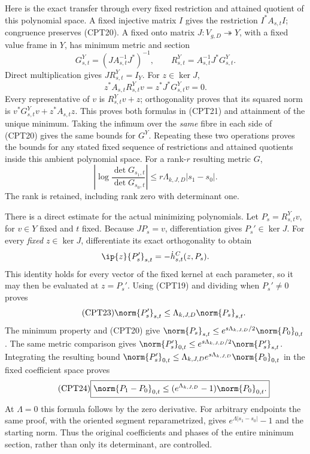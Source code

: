 \documentclass[11pt,a4paper]{article}
\begin{document}
Here is the exact transfer through every fixed restriction and
attained quotient of this polynomial space.  A fixed injective
matrix \(I\) gives the restriction \(I^*A_{s,t}I\); congruence
preserves (CPT20).  A fixed onto matrix
\(J:V_{g,D}\twoheadrightarrow Y\), with a fixed value frame in \(Y\),
has minimum metric and section
\begin{equation}\tag{CPT21}
 G^Y_{s,t}=(J A_{s,t}^{-1}J^*)^{-1},\qquad
 R^Y_{s,t}=A_{s,t}^{-1}J^*G^Y_{s,t}.
\end{equation}
Direct multiplication gives \(JR^Y_{s,t}=I_Y\).
For \(z\in\ker J\),
\[
 z^*A_{s,t}R^Y_{s,t}v=z^*J^*G^Y_{s,t}v=0.
\]
Every representative of \(v\) is \(R^Y_{s,t}v+z\); orthogonality
proves that its squared norm is
\(v^*G^Y_{s,t}v+z^*A_{s,t}z\).
This proves both formulas in (CPT21) and attainment of the unique
minimum.  Taking the infimum over the \emph{same} fibre in each
side of (CPT20) gives the same bounds for \(G^Y\).
Repeating these two operations proves the bounds for any stated
fixed sequence of restrictions and attained quotients inside this
ambient polynomial space.  For a rank-\(r\) resulting metric \(G\),
\begin{equation}\tag{CPT22}
 \left|\log\frac{\det G_{s_1,t}}{\det G_{s_0,t}}\right|
 \le r\Lambda_{k,J,D}|s_1-s_0|.
\end{equation}
The rank is retained, including rank zero with determinant one.

There is a direct estimate for the actual minimizing polynomials.
Let \(P_s=R^Y_{s,t}v\), for \(v\in Y\) fixed and \(t\) fixed.
Because \(JP_s=v\), differentiation gives \(P_s'\in\ker J\).
For every \emph{fixed} \(z\in\ker J\), differentiate its exact
orthogonality to obtain
\[
 \ip{z}{P_s'}_{s,t}=-\dot h^C_{s,t}(z,P_s).
\]
This identity holds for every vector of the fixed kernel at each
parameter, so it may then be evaluated at \(z=P_s'\).
Using (CPT19) and dividing when \(P_s'\ne0\) proves
\begin{equation}\tag{CPT23}
 \norm{P_s'}_{s,t}\le
 \Lambda_{k,J,D}\norm{P_s}_{s,t}.
\end{equation}
The minimum property and (CPT20) give
\(\norm{P_s}_{s,t}\le e^{s\Lambda_{k,J,D}/2}
\norm{P_0}_{0,t}\).
The same metric comparison gives
\(\norm{P_s'}_{0,t}\le e^{s\Lambda_{k,J,D}/2}
\norm{P_s'}_{s,t}\).
Integrating the resulting bound
\(\norm{P_s'}_{0,t}\le
\Lambda_{k,J,D}e^{s\Lambda_{k,J,D}}\norm{P_0}_{0,t}\)
in the fixed coefficient space proves
\begin{equation}\tag{CPT24}
 \boxed{\norm{P_1-P_0}_{0,t}
 \le(e^{\Lambda_{k,J,D}}-1)\norm{P_0}_{0,t}.}
\end{equation}
At \(\Lambda=0\) this formula follows by the zero derivative.
For arbitrary endpoints the same proof, with the oriented segment
reparametrized, gives \(e^{\Lambda|s_1-s_0|}-1\) and the starting
norm.  Thus the original coefficients and phases of the entire
minimum section, rather than only its determinant, are controlled.
\end{document}
